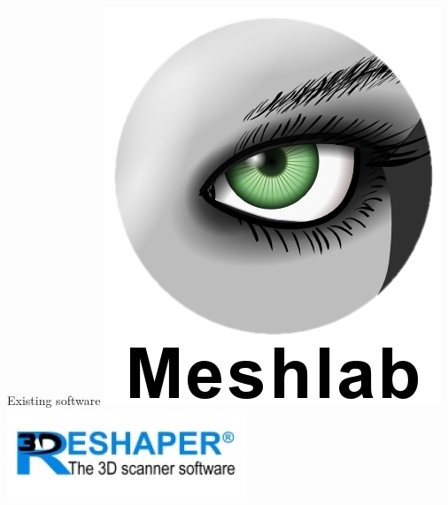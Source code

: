\documentclass[compress]{beamer}
\begin{document}
\begin{frame}{Existing software}
\includegraphics[height=0.10\textheight]{pics/meshlab.png}
\includegraphics[height=0.10\textheight]{pics/3dreshaper.jpg}


\end{frame}
\end{document}
